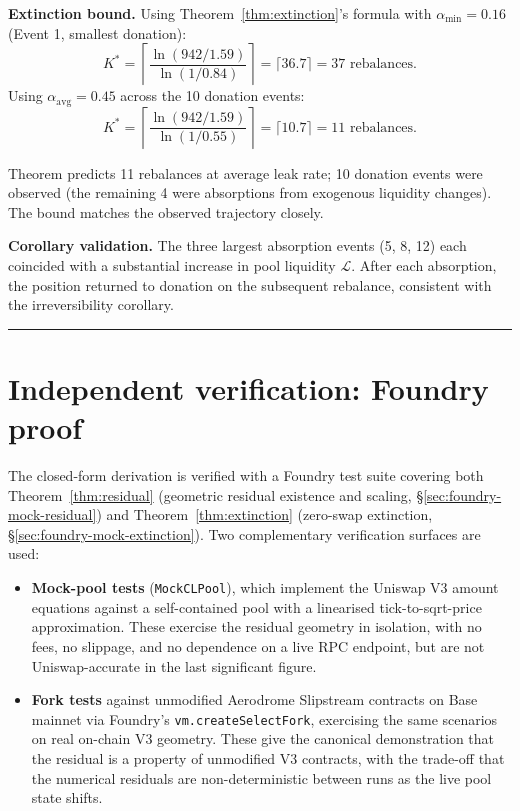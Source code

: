 \documentclass[11pt,a4paper]{article}
\begin{document}
\textbf{Extinction bound.} Using Theorem~\ref{thm:extinction}'s formula with $\alpha_{\min} = 0.16$ (Event 1, smallest donation):
\[
K^* = \left\lceil \frac{\ln(942/1.59)}{\ln(1/0.84)} \right\rceil = \lceil 36.7 \rceil = 37 \text{ rebalances}.
\]
Using $\alpha_{\text{avg}} = 0.45$ across the 10 donation events:
\[
K^* = \left\lceil \frac{\ln(942/1.59)}{\ln(1/0.55)} \right\rceil = \lceil 10.7 \rceil = 11 \text{ rebalances}.
\]

Theorem predicts 11 rebalances at average leak rate; 10 donation events were observed (the remaining 4 were absorptions from exogenous liquidity changes). The bound matches the observed trajectory closely.

\textbf{Corollary validation.} The three largest absorption events (5, 8, 12) each coincided with a substantial increase in pool liquidity $\mathcal{L}$. After each absorption, the position returned to donation on the subsequent rebalance, consistent with the irreversibility corollary.

\begin{center}\rule{0.5\linewidth}{0.5pt}\end{center}

\section{Independent verification: Foundry proof}\label{sec:foundry}

The closed-form derivation is verified with a Foundry test suite covering both Theorem~\ref{thm:residual} (geometric residual existence and scaling, \S\ref{sec:foundry-mock-residual}) and Theorem~\ref{thm:extinction} (zero-swap extinction, \S\ref{sec:foundry-mock-extinction}). Two complementary verification surfaces are used:

\begin{itemize}[leftmargin=*]
    \item \textbf{Mock-pool tests} (\texttt{MockCLPool}), which implement the Uniswap V3 amount equations against a self-contained pool with a linearised tick-to-sqrt-price approximation. These exercise the residual geometry in isolation, with no fees, no slippage, and no dependence on a live RPC endpoint, but are not Uniswap-accurate in the last significant figure.
    \item \textbf{Fork tests} against unmodified Aerodrome Slipstream contracts on Base mainnet via Foundry's \texttt{vm.create\-Select\-Fork}, exercising the same scenarios on real on-chain V3 geometry. These give the canonical demonstration that the residual is a property of unmodified V3 contracts, with the trade-off that the numerical residuals are non-deterministic between runs as the live pool state shifts.
\end{itemize}
\end{document}

